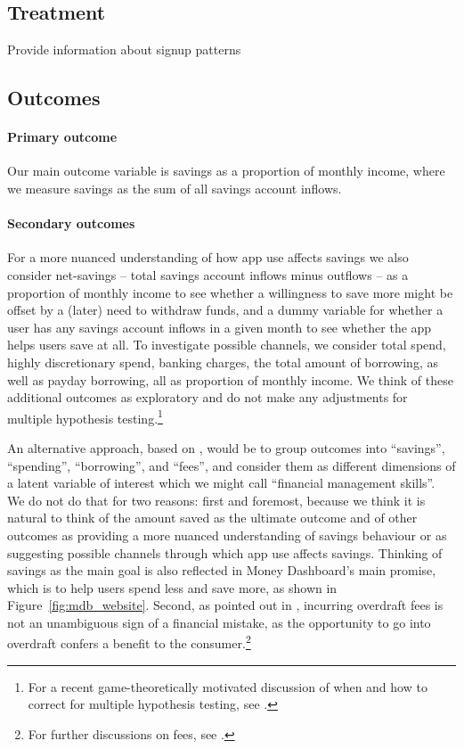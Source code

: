 \documentclass[a4paper, 11pt]{article}
\begin{document}
\subsection{Treatment}%
\label{sub:treatment}

Provide information about signup patterns


\subsection{Outcomes}%
\label{sub:outcomes}

\paragraph{Primary outcome}%
\label{par:primary_outcome}

Our main outcome variable is savings as a proportion of monthly income, where
we measure savings as the sum of all savings account inflows.


\paragraph{Secondary outcomes}%
\label{par:secondary_outcomes}

For a more nuanced understanding of how app use affects savings we also
consider net-savings -- total savings account inflows minus outflows -- as a
proportion of monthly income to see whether a willingness to save more might be
offset by a (later) need to withdraw funds, and a dummy variable for whether a
user has any savings account inflows in a given month to see whether the app
helps users save at all. To investigate possible channels, we consider total
spend, highly discretionary spend, banking charges, the total amount of
borrowing, as well as payday borrowing, all as proportion of monthly income. We
think of these additional outcomes as exploratory and do not make any
adjustments for multiple hypothesis testing.\footnote{For a recent
game-theoretically motivated discussion of when and how to correct for multiple
hypothesis testing, see \citet{viviano2021should}.}

An alternative approach, based on \citet{anderson2008multiple}, would be to
group outcomes into ``savings'', ``spending'', ``borrowing'', and ``fees'', and
consider them as different dimensions of a latent variable of interest which we
might call ``financial management skills''. We do not do that for two reasons:
first and foremost, because we think it is natural to think of the amount saved
as the ultimate outcome and of other outcomes as providing a more nuanced
understanding of savings behaviour or as suggesting possible channels through
which app use affects savings. Thinking of savings as the main goal is also
reflected in Money Dashboard's main promise, which is to help users spend less
and save more, as shown in Figure~\ref{fig:mdb_website}. Second, as pointed out
in \citet{carlin2017fintech}, incurring overdraft fees is not an unambiguous
sign of a financial mistake, as the opportunity to go into overdraft confers a
benefit to the consumer.\footnote{For further discussions on fees, see
\citet{jorring2020financial, stango2009consumers}.}
\end{document}
